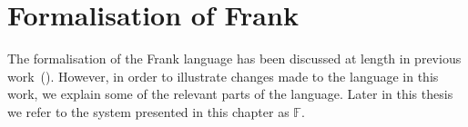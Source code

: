 \documentclass[msc,deptreport,cs]{infthesis} %
\makeatletter
\newcommand\figscale{0.9}
\newcommand\purefrank{$\mathbb{F}$}
\newcommand{\many}{\overline}
\newcommand\ba{\begin{array}}
\newcommand\ea{\end{array}}
\newenvironment{syn}{\ba{@{}l@{~}r@{~}c@{~}l@{}}}{\ea}
\newcommand{\adj}{\Delta}
\newcommand{\sigs}{\Sigma}
\newcommand{\thunk}[1]{\{{#1}\}}
\newcommand\slab[1]{(\textrm{#1})}
\newcommand{\effin}[1]{\langle {#1} \rangle}
\newcommand{\effout}[1]{[{#1}]}
\newcommand{\gor}{\mid}
\makeatother
\begin{document}
\chapter{Formalisation of Frank}
\label{chap:formalisation}

The formalisation of the Frank language has been discussed at length in previous
work~(\cite{convent2020doo}). However, in order to illustrate changes made to
the language in this work, we explain some of the relevant parts of the
language. Later in this thesis we refer to the system presented in this chapter as \purefrank.

\begin{figure}[h]  %
\scalebox{\figscale}{%
\[
\ba{@{}c@{}}
\ba{@{}c@{\quad\quad}c@{}}
\begin{syn}
  \slab{data types}            & D \\
  \slab{value type variables}  & X \\
  \slab{effect type variables} & E \\
  \slab{value types}           & A, B   &::= & D~\overline{R} \\
                               &        &\gor& \thunk{C} \gor X \\
  \slab{computation types}     & C      &::= & \many{T \to}~G \\
  \slab{argument types}        & T      &::= & \effin{\adj}A \\
  \slab{return types}          & G      &::= & \effout{\sigs}A \\


\end{syn}\]}
\end{figure}
\end{document}
